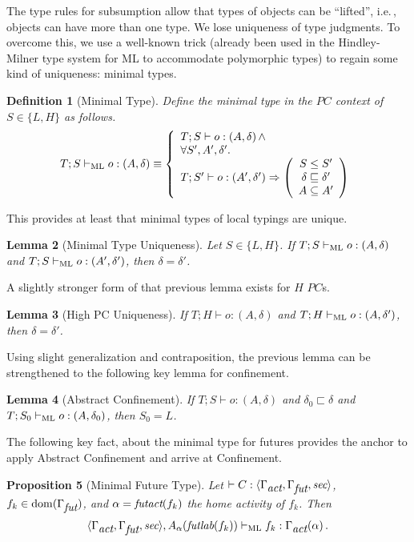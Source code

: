 \documentclass[10pt, conference, compsocconf]{IEEEtran}
\newcommand{\symb}[1]{\makebox{\it #1}}
\newcommand\dom{{\rm dom}}
\newcommand\ie{i.e.\!\,, }
\newtheorem{definition}{Definition}[section]
\newtheorem{proposition}[definition]{Proposition}
\newtheorem{lemma}[definition]{Lemma}
\begin{document}
{The type rules for subsumption allow that 
types of objects can be ``lifted'', \ie
objects can have more than one type. We lose uniqueness of type judgments. To overcome this, we use a well-known trick (already
been used in the Hindley-Milner type system for ML to accommodate polymorphic types) 
to regain some kind of uniqueness: minimal types. 
\begin{definition}[Minimal Type]
Define the minimal type in the $PC$ context of $S  \in \{L, H\}$ as follows.
\[T; S \vdash_{{\rm \footnotesize ML}} o: (A, \delta) \equiv 
  \left\{
   \begin{array}{l}
  T; S \vdash o: (A, \delta)\, \wedge  \\
    \forall S',A', \delta'. \\
    T; S' \vdash o: (A', \delta') \Rightarrow 
     \left(
     \begin{array}{c}
        S \leq S' \\
        \delta \sqsubseteq \delta' \\
        A \subseteq A'
     \end{array}
     \right)
   \end{array}\right.
\]
\end{definition}
This provides at least that minimal types of local typings are unique.
\begin{lemma}[Minimal Type Uniqueness]
Let $S \in \{L, H\}$.
If $T; S \vdash_{{\rm \footnotesize ML}} o: (A, \delta)$ and $T; S \vdash_{{\rm \footnotesize ML}} o: (A', \delta')$, 
then $\delta = \delta'$.
\end{lemma}

A slightly stronger form of that previous lemma exists for $H$ $PC$s.
\begin{lemma}[High PC Uniqueness]
If $T; H \vdash o: (A, \delta)$ and $T; H \vdash_{{\rm \footnotesize ML}} o: (A, \delta')$, then $\delta = \delta'$.
\end{lemma}

Using slight generalization and contraposition, the previous lemma can be strengthened to the following key
lemma for confinement.
\begin{lemma}[Abstract Confinement]
\label{lem:absconf}
If $T; S \vdash o: (A, \delta)$ and $\delta_0 \sqsubset \delta$ and $T; S_0 \vdash_{{\rm \footnotesize ML}} o: (A, \delta_0)$, 
then $S_0 = L$.
\end{lemma}
The following key fact, about the minimal type for futures provides the anchor to apply 
Abstract Confinement and arrive at Confinement.
\begin{proposition}[Minimal Future Type]
\label{prop:minfut}
Let $\vdash C: \langle \Gamma_{\symb{act}}, \Gamma_{\symb{fut}}, \symb{sec} \rangle$,
$f_k \in \dom(\Gamma_{\symb{fut}})$, and $\alpha = \symb{futact}(f_k)$ the home activity of $f_k$. Then 
\[  
\langle \Gamma_{\symb{act}},\Gamma_{\symb{fut}}, \symb{sec}\rangle, A_\alpha(\symb{futlab}(f_k)) \vdash_{{\rm \footnotesize ML}} 
f_k: \Gamma_{\symb{act}}(\alpha) \,.
\]
\end{proposition}


}
\end{document}
